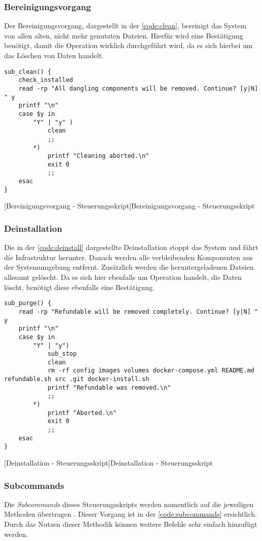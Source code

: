 \subsubsection{Bereinigungsvorgang}

Der Bereinigungsvorgang, dargestellt in der \autoref{code:clean}, bereinigt das System von allen alten, nicht mehr genutzten Dateien. Hierfür wird eine Bestätigung benötigt, damit die Operation wirklich durchgeführt wird, da es sich hierbei um das Löschen von Daten handelt.

\begin{verbatim}
sub_clean() {
	check_installed
	read -rp "All dangling components will be removed. Continue? [y|N] " y
	printf "\n"
	case $y in
		"Y" | "y" )
			clean
			;;
		*)
			printf "Cleaning aborted.\n"
			exit 0
			;;
	esac
}
\end{verbatim}
[Bereinigungsvorgang - Steuerungsskript]{Bereinigungsvorgang - Steuerungsskript}
\label{code:clean}

\newpage

\subsubsection{Deinstallation}
Die in der \autoref{code:deinstall} dargestellte Deinstallation stoppt das System und fährt die Infrastruktur herunter. Danach werden alle verbleibenden Komponenten aus der Systemumgebung entfernt. Zusätzlich werden die heruntergeladenen Dateien allesamt gelöscht. Da es sich hier ebenfalls um Operation handelt, die Daten löscht, benötigt diese ebenfalls eine Bestätigung.

\begin{verbatim}
sub_purge() {
	read -rp "Refundable will be removed completely. Continue? [y|N] " y
	printf "\n"
	case $y in
		"Y" | "y")
			sub_stop
			clean
			rm -rf config images volumes docker-compose.yml README.md refundable.sh src .git docker-install.sh
			printf "Refundable was removed.\n"
			;;
		*)
			printf "Aborted.\n"
			exit 0
			;;
	esac
}
\end{verbatim}
[Deinstallation - Steuerungsskript]{Deinstallation - Steuerungsskript}
\label{code:deinstall}

\subsubsection{Subcommands}

Die \textit{Subcommands} dieses Steuerungsskripts werden namentlich auf die jeweiligen Methoden übertragen \cite{shgist}. Dieser Vorgang ist in der \autoref{code:subcommands} ersichtlich. Durch das Nutzen dieser Methodik können weitere Befehle sehr einfach hinzufügt werden.

